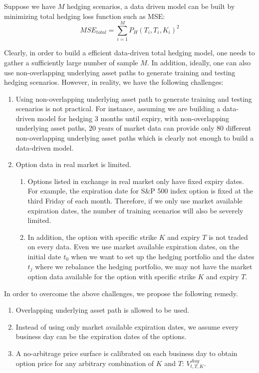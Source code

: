 \documentclass[letterpaper,12pt,titlepage,oneside,final]{book}
\numberwithin{equation}{section}
\theoremstyle{definition}
\begin{document}
Suppose we have $M$ hedging scenarios, a data driven model can be built by minimizing total hedging loss function such as MSE:
\[
    MSE_{total}=\sum_{i=1}^M P_H(T_i,T_i,K_i)^2
\]

Clearly, in order to build a efficient data-driven total hedging model, one needs to gather a sufficiently large number of sample  $M$.  In addition, ideally, one can also use non-overlapping underlying asset paths to generate training and testing hedging scenarios.
However, in reality,  we have the following challenges:
\begin{enumerate}
	\item Using non-overlapping underlying asset path to  generate training and testing scenarios is not practical. For instance, assuming we are building a data-driven model for hedging 3 months until expiry, with non-overlapping underlying asset paths, 20 years of market data can provide only 80 different non-overlapping underlying asset paths which is clearly not enough to build a data-driven model.
	\item Option data  in real market is limited. 
	\begin{enumerate}
		\item Options listed in exchange in real market only have fixed expiry dates. For example, the expiration date for  S\&P 500 index option is fixed at the third Friday of each month. Therefore, if we only use market available expiration dates, the number of training scenarios will also be severely limited. 
		\item In addition, the option with specific strike $K$ and expiry $T$ is not traded on every data. Even we use market available expiration dates, on the initial date $t_0$ when we want to set up the hedging portfolio and the dates $t_j$ where we rebalance the hedging portfolio, we may not have the  market option data available for  the option with specific strike $K$ and expiry $T$.
	\end{enumerate}
\end{enumerate}
In order to overcome the above challenges, we propose the following remedy.  
\begin{enumerate}
	\item Overlapping underlying asset path is allowed to be used.
	\item Instead of using only market available expiration dates, we assume every business day can be the expiration dates of the options.
	\item A no-arbitrage price surface is calibrated on each business day to obtain option price for any arbitrary combination of  $K$ and $T$: $V^{Aug}_{t,T,K}$.
\end{enumerate}
\end{document}
